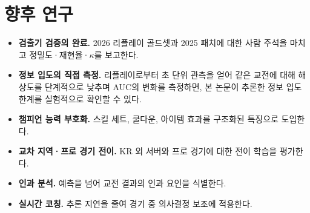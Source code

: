 
\section{향후 연구}

\begin{itemize}[leftmargin=1.5em]
  \item \textbf{검출기 검증의 완료.} 2026 리플레이 골드셋과 2025 패치에 대한 사람 주석을 마치고 정밀도·재현율·$\kappa$를 보고한다.
  \item \textbf{정보 입도의 직접 측정.} 리플레이로부터 초 단위 관측을 얻어 같은 교전에 대해 해상도를 단계적으로 낮추며 AUC의 변화를 측정하면, 본 논문이 추론한 정보 입도 한계를 실험적으로 확인할 수 있다.
  \item \textbf{챔피언 능력 부호화.} 스킬 세트, 쿨다운, 아이템 효과를 구조화된 특징으로 도입한다.
  \item \textbf{교차 지역·프로 경기 전이.} KR 외 서버와 프로 경기에 대한 전이 학습을 평가한다.
  \item \textbf{인과 분석.} 예측을 넘어 교전 결과의 인과 요인을 식별한다.
  \item \textbf{실시간 코칭.} 추론 지연을 줄여 경기 중 의사결정 보조에 적용한다.
\end{itemize}
